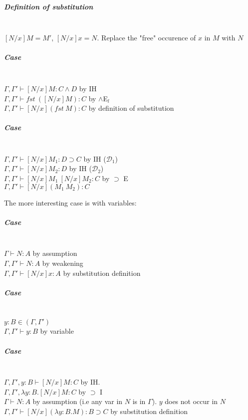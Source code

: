 \documentclass[12 pt]{article}
\begin{document}
    \subparagraph{Definition of substitution}
    ~\\$[N/x]M = M'$, $[N/x] x = N$. Replace the "free" occurence of
    $x$ in $M$ with $N$
    
    \subparagraph{Case}
    \noLine
    \DP
    \\ $\Gamma, \Gamma ' \vdash [N/x] M : C\land D$ by IH
    \\ $\Gamma, \Gamma ' \vdash fst\ ([N/x]M) : C$ by $\land$E$_l$
    \\$\Gamma, \Gamma' \vdash [N/x](fst \ M) : C$ by definition of substitution
    \subparagraph{Case}
    \noLine
    
    \noLine
    \DP
    \\ $\Gamma, \Gamma ' \vdash [N/x] M_1 : D \supset C$ by IH ($\mathcal{D}_1$)
    \\ $\Gamma, \Gamma ' \vdash [N/x] M_2 : D$ by IH ($\mathcal{D}_2$)
    \\$\Gamma, \Gamma' \vdash [N/x]M_1 \ [N/x]M_2 : C$ by $\supset$ E
    \\ $\Gamma, \Gamma' \vdash [N/x](M_1\ M_2) : C$

    The more interesting case is with variables:
    \subparagraph{Case}
    
    \DP
    \\ $\Gamma \vdash N:A$ by assumption
    \\ $\Gamma, \Gamma' \vdash N : A$ by weakening
    \\ $\Gamma, \Gamma' \vdash [N/x]x : A$ by substitution definition
    \subparagraph{Case}
    
    \DP
    \\ $y:B \in (\Gamma, \Gamma')$
    \\ $\Gamma, \Gamma' \vdash y : B$ by variable
    \subparagraph{Case}
    
    \DP
    \\ $\Gamma, \Gamma', y:B \vdash [N/x] M:C$ by IH.
    \\ $\Gamma, \Gamma', \lambda y : B . [N/x] M:C$ by $\supset$ I 
    \\ $\Gamma \vdash N : A$ by assumption (i.e any var in $N$ is in
    $\Gamma$). $y$ does not occur in $N$
    \\ $\Gamma, \Gamma ' \vdash [N/x] (\lambda y:B.M) : B \supset C$
    by substitution definition
\end{document}
